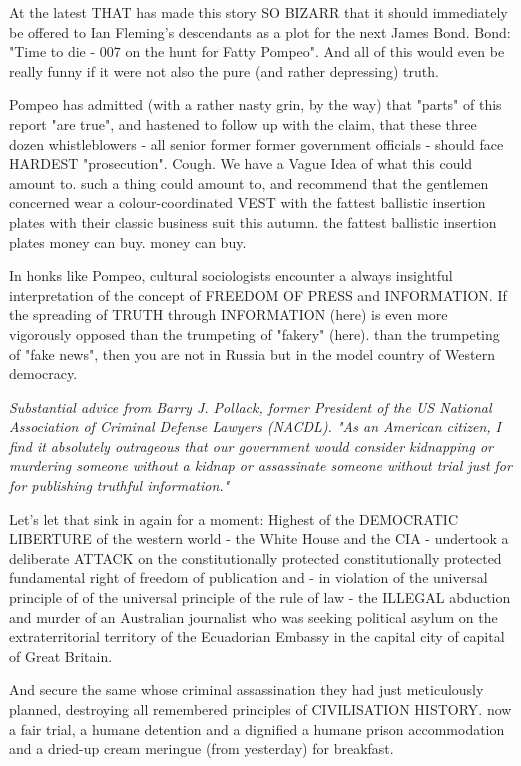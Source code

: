 \begin{multicols}{2}
At the latest THAT has made this story SO BIZARR that it should immediately be offered to Ian Fleming's descendants as a plot for the next James Bond.
Bond: "Time to die - 007 on the hunt for Fatty Pompeo". And all of this would even be really funny if
it were not also the pure (and rather depressing) truth.

Pompeo has admitted (with a rather nasty grin, by the way) that "parts" of this report "are true",
and hastened to follow up with the claim,
that these three dozen whistleblowers - all senior former
former government officials - should face HARDEST "prosecution". Cough. We
have a Vague Idea of what this could amount to.
such a thing could amount to, and recommend that the gentlemen concerned wear a colour-coordinated VEST with the fattest ballistic insertion plates with their classic business suit this autumn.
the fattest ballistic insertion plates money can buy.
money can buy.

In honks like Pompeo, cultural sociologists encounter a
always insightful interpretation of the concept of FREEDOM OF PRESS and INFORMATION.
If the spreading of TRUTH through INFORMATION (here) is even more vigorously opposed than the trumpeting of "fakery" (here).
than the trumpeting of "fake news", then you are not in Russia but in the model country of Western democracy.

\textit{Substantial advice from Barry J. Pollack, former
President of the US National Association of Criminal Defense Lawyers (NACDL).
"As an American citizen, I find it absolutely outrageous that our government would consider kidnapping or murdering someone without a
kidnap or assassinate someone without trial just for
for publishing truthful information."}

Let's let that sink in again for a moment: Highest
of the DEMOCRATIC LIBERTURE of the western world - the White House and the
CIA - undertook a deliberate ATTACK on the constitutionally protected
constitutionally protected fundamental right of freedom of publication and - in violation of the universal principle of
of the universal principle of the rule of law - the
ILLEGAL abduction and murder of an Australian journalist who was seeking political asylum on the extraterritorial territory of the Ecuadorian Embassy in the capital city of
capital of Great Britain.

And secure the same whose criminal assassination
they had just meticulously planned, destroying all remembered principles of CIVILISATION HISTORY.
now a fair trial, a humane detention and a dignified
a humane prison accommodation and a dried-up cream meringue (from yesterday) for breakfast.


\end{multicols}

